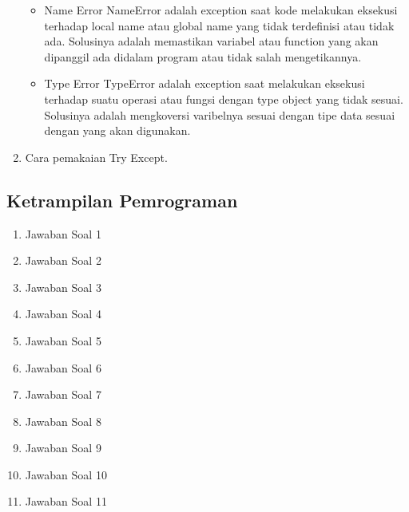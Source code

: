 \begin{enumerate}
\begin{itemize}
\item Name Error
NameError adalah exception saat kode melakukan eksekusi terhadap local name atau global name yang tidak terdefinisi atau tidak ada. Solusinya adalah memastikan variabel atau function yang akan dipanggil ada didalam program atau tidak salah mengetikannya.

\item Type Error
TypeError adalah exception saat melakukan eksekusi terhadap suatu operasi atau fungsi dengan type object yang tidak sesuai. Solusinya adalah mengkoversi varibelnya sesuai dengan tipe data sesuai dengan yang akan digunakan.

\end{itemize}

\item Cara pemakaian Try Except.


\end{enumerate}
\hfill \break

\subsection{Ketrampilan Pemrograman}

\begin{enumerate}
\item Jawaban Soal 1


\item Jawaban Soal 2


\item Jawaban Soal 3


\item Jawaban Soal 4


\item Jawaban Soal 5


\item Jawaban Soal 6


\item Jawaban Soal 7


\item Jawaban Soal 8


\item Jawaban Soal 9


\item Jawaban Soal 10


\item Jawaban Soal 11


\end{enumerate}
\hfill \break

